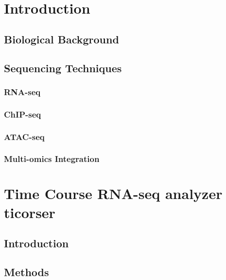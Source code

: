 \documentclass[b5paper,oneside,british,intoc,bibliograph=totoc,index=totoc,BCOR10mm,twoside,openright]{book}
\numberwithin{equation}{section}
\numberwithin{figure}{section}
\begin{document}

%
\newpage
\chapter{Introduction}


\section{Biological Background}

\section{Sequencing Techniques}\label{sec:seqs}

\subsection{RNA-seq} \label{sec:rnaseq}

\subsection{ChIP-seq} \label{sec:chipseq}

\subsection{ATAC-seq} \label{sec:atacseq}

\subsection{Multi-omics Integration} \label{sec:integration}




\chapter{Time Course RNA-seq analyzer \newline \textbf{ticorser}} \label{sec:ticorsercap}


\section{Introduction} \label{sec:ticorseintro}


\section{Methods} \label{sec:ticorseintromethods}

\end{document}
